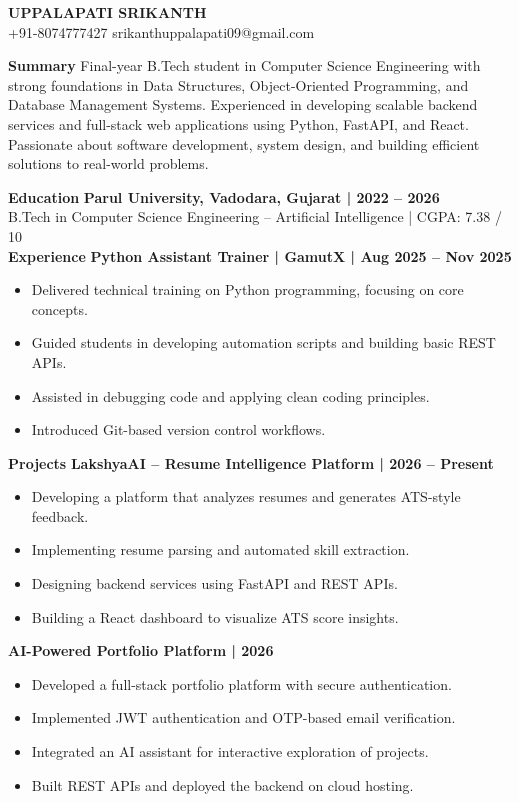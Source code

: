\documentclass[10pt]{article}
\begin{document}
\begin{center}
    {\LARGE \textbf{UPPALAPATI SRIKANTH}} \\
    +91-8074777427 \textbar{} srikanthuppalapati09@gmail.com
\end{center}

\textbf{Summary}
Final-year B.Tech student in Computer Science Engineering with strong foundations in Data Structures, Object-Oriented Programming, and Database Management Systems. Experienced in developing scalable backend services and full-stack web applications using Python, FastAPI, and React. Passionate about software development, system design, and building efficient solutions to real-world problems.

\textbf{Education}
\textbf{Parul University, Vadodara, Gujarat | 2022 – 2026}\\
B.Tech in Computer Science Engineering – Artificial Intelligence | CGPA: 7.38 / 10\\

\textbf{Experience}
\textbf{Python Assistant Trainer | GamutX | Aug 2025 – Nov 2025}
\begin{itemize}
\item Delivered technical training on Python programming, focusing on core concepts.
\item Guided students in developing automation scripts and building basic REST APIs.
\item Assisted in debugging code and applying clean coding principles.
\item Introduced Git-based version control workflows.
\end{itemize}

\textbf{Projects}
\textbf{LakshyaAI – Resume Intelligence Platform | 2026 – Present}
\begin{itemize}
\item Developing a platform that analyzes resumes and generates ATS-style feedback.
\item Implementing resume parsing and automated skill extraction.
\item Designing backend services using FastAPI and REST APIs.
\item Building a React dashboard to visualize ATS score insights.
\end{itemize}

\textbf{AI-Powered Portfolio Platform | 2026}
\begin{itemize}
\item Developed a full-stack portfolio platform with secure authentication.
\item Implemented JWT authentication and OTP-based email verification.
\item Integrated an AI assistant for interactive exploration of projects.
\item Built REST APIs and deployed the backend on cloud hosting.
\end{itemize}
\end{document}
